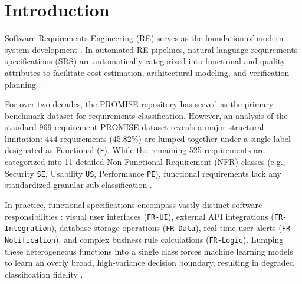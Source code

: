 \documentclass[pdflatex,sn-mathphys-num]{sn-jnl}
\begin{document}
\maketitle

\section{Introduction}\label{sec:intro}
Software Requirements Engineering (RE) serves as the foundation of modern system development \cite{kassab2014state}. In automated RE pipelines, natural language requirements specifications (SRS) are automatically categorized into functional and quality attributes to facilitate cost estimation, architectural modeling, and verification planning \cite{zhao2021deep, dalpiaz2019natural}.

For over two decades, the PROMISE repository \cite{sayyad2005promise} has served as the primary benchmark dataset for requirements classification. However, an analysis of the standard 969-requirement PROMISE dataset reveals a major structural limitation: 444 requirements (45.82\%) are lumped together under a single label designated as Functional (\texttt{F}). While the remaining 525 requirements are categorized into 11 detailed Non-Functional Requirement (NFR) classes (e.g., Security \texttt{SE}, Usability \texttt{US}, Performance \texttt{PE}), functional requirements lack any standardized granular sub-classification \cite{winkler2016nlp, slankas2013automated}.

In practice, functional specifications encompass vastly distinct software responsibilities \cite{abad2016task, heymann2020fine}: visual user interfaces (\texttt{FR-UI}), external API integrations (\texttt{FR-Integration}), database storage operations (\texttt{FR-Data}), real-time user alerts (\texttt{FR-Notification}), and complex business rule calculations (\texttt{FR-Logic}). Lumping these heterogeneous functions into a single class forces machine learning models to learn an overly broad, high-variance decision boundary, resulting in degraded classification fidelity \cite{rahimi2022towards}.
\end{document}

